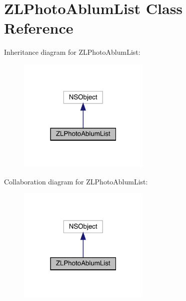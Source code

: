 \hypertarget{interface_z_l_photo_ablum_list}{}\section{Z\+L\+Photo\+Ablum\+List Class Reference}
\label{interface_z_l_photo_ablum_list}


Inheritance diagram for Z\+L\+Photo\+Ablum\+List\+:\nopagebreak
\begin{figure}[H]
\begin{center}
\leavevmode
\includegraphics[width=178pt]{interface_z_l_photo_ablum_list__inherit__graph}
\end{center}
\end{figure}


Collaboration diagram for Z\+L\+Photo\+Ablum\+List\+:\nopagebreak
\begin{figure}[H]
\begin{center}
\leavevmode
\includegraphics[width=178pt]{interface_z_l_photo_ablum_list__coll__graph}
\end{center}
\end{figure}
